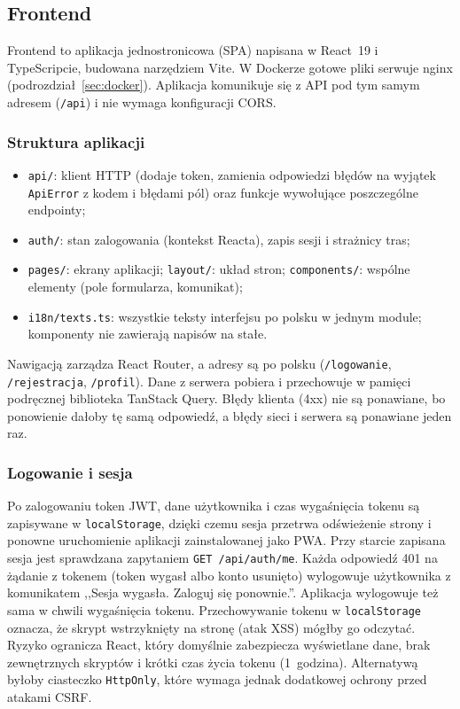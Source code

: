 \subsection{Frontend}
\label{sec:frontend}

Frontend to aplikacja jednostronicowa (SPA) napisana w React~19 i TypeScripcie,
budowana narzędziem Vite. W Dockerze gotowe pliki
serwuje nginx (podrozdział~\ref{sec:docker}). Aplikacja komunikuje się z API
pod tym samym adresem (\texttt{/api}) i nie wymaga konfiguracji CORS.

\subsubsection{Struktura aplikacji}

\begin{itemize}
  \item \texttt{api/}: klient HTTP (dodaje token, zamienia odpowiedzi błędów na
        wyjątek \texttt{ApiError} z kodem i błędami pól) oraz funkcje wywołujące
        poszczególne endpointy;
  \item \texttt{auth/}: stan zalogowania (kontekst Reacta), zapis sesji
        i strażnicy tras;
  \item \texttt{pages/}: ekrany aplikacji; \texttt{layout/}: układ stron;
        \texttt{components/}: wspólne elementy (pole formularza, komunikat);
  \item \texttt{i18n/texts.ts}: wszystkie teksty interfejsu po polsku w jednym
        module; komponenty nie zawierają napisów na stałe.
\end{itemize}

Nawigacją zarządza React Router, a adresy są po polsku (\texttt{/logowanie},
\texttt{/rejestracja}, \texttt{/profil}). Dane z serwera pobiera i przechowuje
w pamięci podręcznej biblioteka TanStack Query. Błędy klienta (4xx) nie są
ponawiane, bo ponowienie dałoby tę samą odpowiedź, a błędy sieci i serwera
są ponawiane jeden raz.

\subsubsection{Logowanie i sesja}

Po zalogowaniu token JWT, dane użytkownika i czas wygaśnięcia tokenu są
zapisywane w \texttt{localStorage}, dzięki czemu sesja przetrwa odświeżenie
strony i ponowne uruchomienie aplikacji zainstalowanej jako PWA. Przy starcie
zapisana sesja jest sprawdzana zapytaniem \texttt{GET /api/auth/me}. Każda
odpowiedź 401 na żądanie z tokenem (token wygasł albo konto usunięto) wylogowuje
użytkownika z komunikatem ,,Sesja wygasła. Zaloguj się ponownie.''. Aplikacja
wylogowuje też sama w chwili wygaśnięcia tokenu. Przechowywanie tokenu
w \texttt{localStorage} oznacza, że skrypt wstrzyknięty na stronę (atak XSS)
mógłby go odczytać. Ryzyko ogranicza React, który domyślnie zabezpiecza
wyświetlane dane, brak zewnętrznych skryptów i krótki czas życia tokenu
(1~godzina). Alternatywą byłoby ciasteczko \texttt{HttpOnly}, które wymaga
jednak dodatkowej ochrony przed atakami CSRF.

